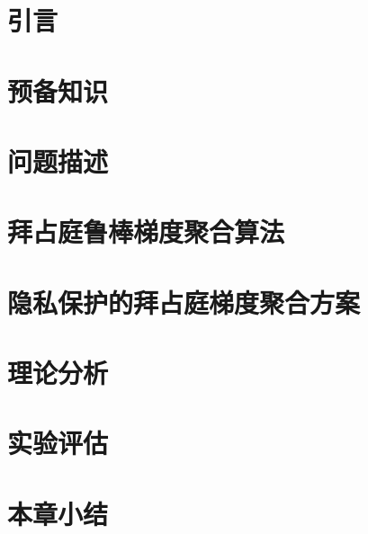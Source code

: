 
\section{引言}

\section{预备知识}

\section{问题描述}

\section{拜占庭鲁棒梯度聚合算法}

\section{隐私保护的拜占庭梯度聚合方案}

\section{理论分析}

\section{实验评估}

\section{本章小结}